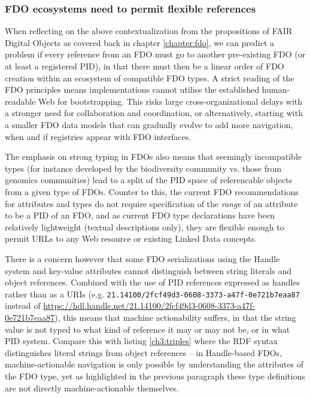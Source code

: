 \subsubsection{FDO ecosystems need to permit flexible references}

When reflecting on the above contextualization from the propositions of FAIR Digital Objects as covered back in chapter \ref{chapter:fdo}, we can predict a problem if every reference from an FDO must go to another pre-existing FDO (or at least a registered PID), in that there must then be a linear order of FDO creation within an ecosystem of compatible FDO types.
A strict reading of the FDO principles means implementations cannot utilise the established human-readable Web for bootstrapping.
This risks large cross-organizational delays with a stronger need for collaboration and coordination, or alternatively, starting with a smaller FDO data models that can gradually evolve to add more navigation, when and if registries appear with FDO interfaces. 

The emphasis on strong typing in FDOs also means that seemingly incompatible types (for instance developed by the biodiversity community vs. those from genomics communities) lead to a split of the PID space of referencable objects from a given type of FDOs.  Counter to this, the current FDO recommendations for attributes and types \cite{fdo-ImplAttributesTypesProfiles} do not require specification of the \emph{range} of an attribute to be a PID of an FDO, and as current FDO type declarations have been relatively lightweight (textual descriptions only), they are flexible enough to permit URLs to any Web resource or existing Linked Data concepts.  

There is a concern however that some FDO serializations using the Handle system and key-value attributes cannot distinguish between string literals and object references.
Combined with the use of PID references expressed as handles rather than as a URIs (e.g. \texttt{21.14100/2fcf49d3-0608-3373-a47f-0e721b7eaa87} instead of \url{https://hdl.handle.net/21.14100/2fcf49d3-0608-3373-a47f-0e721b7eaa87}), this means that machine actionability suffers, in that the string value is not typed to what kind of reference it may or may not be, or in what PID system. Compare this with listing \vref{ch3:triples} where the RDF syntax distinguishes literal strings from object references -- in Handle-based FDOs, machine-actionable navigation is only possible by understanding the attributes of the FDO type, yet as highlighted in the previous paragraph these type definitions are not directly machine-actionable themselves.

